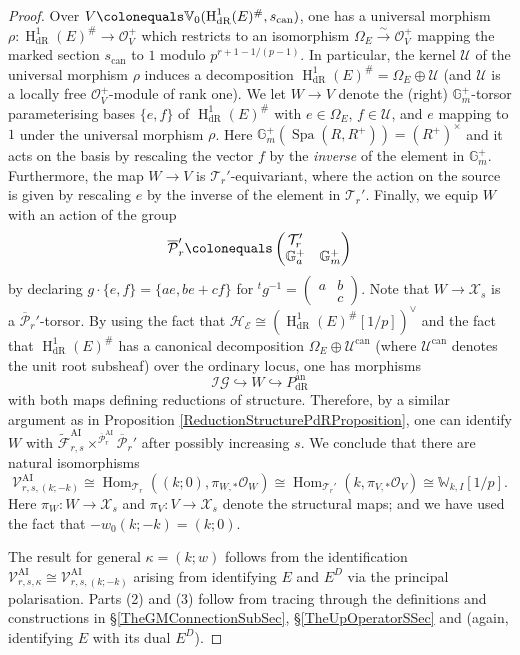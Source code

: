 \documentclass[10pt, oneside]{amsart}
\newcommand{\defeq}{\colonequals}
\renewcommand{\tilde}{\widetilde}
\numberwithin{equation}{subsection}
\theoremstyle{definition}
\theoremstyle{remark}
\newcommand{\mbb}[1]{\mathbb{#1}}
\newcommand{\opn}[1]{\operatorname{#1}}
\newcommand{\tbyt}[4]{\left( \begin{matrix} #1 & #2 \\ #3 & #4 \end{matrix} \right)}
\begin{document}
\begin{proof}
Over $V \defeq \mbb{V}_0(\opn{H}^1_{\opn{dR}}(E)^{\#}, s_{\opn{can}})$, one has a universal morphism $\rho \colon \opn{H}^1_{\opn{dR}}(E)^{\#} \to \mathcal{O}^+_V$ which restricts to an isomorphism $\Omega_E \xrightarrow{\sim} \mathcal{O}^+_V$ mapping the marked section $s_{\opn{can}}$ to $1$ modulo $p^{r+1-1/(p-1)}$. In particular, the kernel $\mathcal{U}$ of the universal morphism $\rho$ induces a decomposition $\opn{H}^1_{\opn{dR}}(E)^{\#} = \Omega_E \oplus \mathcal{U}$ (and $\mathcal{U}$ is a locally free $\mathcal{O}^+_V$-module of rank one). We let $W \to V$ denote the (right) $\mbb{G}^+_m$-torsor parameterising bases $\{ e, f\}$ of $\opn{H}^1_{\opn{dR}}(E)^{\#}$ with $e \in \Omega_E$, $f \in \mathcal{U}$, and $e$ mapping to $1$ under the universal morphism $\rho$. Here $\mbb{G}_m^+(\opn{Spa}(R, R^+)) = (R^+)^{\times}$ and it acts on the basis by rescaling the vector $f$ by the \emph{inverse} of the element in $\mbb{G}_m^+$. Furthermore, the map $W \to V$ is $\mathcal{T}_r'$-equivariant, where the action on the source is given by rescaling $e$ by the inverse of the element in $\mathcal{T}_r'$. Finally, we equip $W$ with an action of the group 
\[
\overline{\mathcal{P}}_r' \defeq \tbyt{\mathcal{T}_r'}{}{\mbb{G}_a^+}{\mbb{G}_m^+}
\]
by declaring $g \cdot \{e, f \} = \{ a e, b e + c f\}$ for ${^tg^{-1}} = \tbyt{a}{b}{}{c}$. Note that $W \to \mathcal{X}_s$ is a $\overline{\mathcal{P}}_r'$-torsor. By using the fact that $\mathcal{H}_{\mathcal{E}} \cong \left(\opn{H}^1_{\opn{dR}}(E)^{\#}[1/p]\right)^{\vee}$ and the fact that $\opn{H}^1_{\opn{dR}}(E)^{\#}$ has a canonical decomposition $\Omega_E \oplus \mathcal{U}^{\opn{can}}$ (where $\mathcal{U}^{\opn{can}}$ denotes the unit root subsheaf) over the ordinary locus, one has morphisms
\[
\mathcal{IG} \hookrightarrow W \hookrightarrow P_{\opn{dR}}^{\opn{an}}
\]
with both maps defining reductions of structure. Therefore, by a similar argument as in Proposition \ref{ReductionStructurePdRProposition}, one can identify $W$ with $\tilde{\mathcal{F}}_{r, s}^{\opn{AI}} \times^{\overline{\mathcal{P}}_r^{\opn{AI}}} \overline{\mathcal{P}}_r'$ after possibly increasing $s$. We conclude that there are natural isomorphisms
\[
\mathcal{V}_{r, s, (k;-k)}^{\opn{AI}} \cong \opn{Hom}_{\mathcal{T}_r}((k;0), \pi_{W, *}\mathcal{O}_W ) \cong \opn{Hom}_{\mathcal{T}_r'}(k, \pi_{V, *} \mathcal{O}_V) \cong \mbb{W}_{k, I}[1/p] .
\]
Here $\pi_W \colon W \to \mathcal{X}_s$ and $\pi_V \colon V \to \mathcal{X}_s$ denote the structural maps; and we have used the fact that $-w_0 (k; -k) = (k; 0)$. 

The result for general $\kappa = (k; w)$ follows from the identification $\mathcal{V}_{r, s, \kappa}^{\opn{AI}} \cong \mathcal{V}_{r, s, (k;-k)}^{\opn{AI}}$ arising from identifying $E$ and $E^D$ via the principal polarisation. Parts (2) and (3) follow from tracing through the definitions and constructions in \S \ref{TheGMConnectionSubSec}, \S \ref{TheUpOperatorSSec} and \cite[\S 3.4, \S 3.6--\S 3.7]{AI_LLL} (again, identifying $E$ with its dual $E^D$).
\end{proof}
\end{document}
